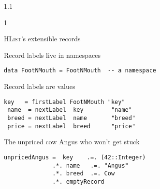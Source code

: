 \documentclass{slides}
\newenvironment{myslide}{\begin{slide}\color{Blue}\begin{boxedminipage}{1.1\hsize}\begin{boxedminipage}{1\hsize}\color{Black}
\vspace{-170\in}
}{%
\smallskip
\end{boxedminipage}
\end{boxedminipage}
\end{slide}}
\newenvironment{myslide}{\begin{slide}
}{%
\end{slide}}
\newenvironment{myslide}{\begin{slide}\color{White}\begin{boxedminipage}{1.1\hsize}\color{Black}
\vspace{-170\in}
}{%
\smallskip
\end{boxedminipage}
\end{slide}}
\newcommand{\header}[1]{{\large \color{Red} #1}}
\newcommand{\blau}[1]{{\vspace{-50\in}\normalsize \color{Blue} #1}}
\newcommand{\HList}{\textsc{HList}}
\begin{document}
\begin{myslide}

\header{\HList's extensible records}

\vspace{-77\in}

\blau{Record labels live in namespaces}

\smallskip

\begin{Verbatim}[fontfamily=courier,fontsize=\small,commandchars=\\\{\}]
 data FootNMouth = FootNMouth  -- a namespace
\end{Verbatim}

\vspace{-77\in}

\blau{Record labels are values}

\smallskip

\begin{Verbatim}[fontfamily=courier,fontsize=\small,commandchars=\\\{\}]
 key   = firstLabel FootNMouth "key"
 name  = nextLabel  key        "name"
 breed = nextLabel  name       "breed"
 price = nextLabel  breed      "price"  
\end{Verbatim}

\vspace{-77\in}

\blau{The unpriced cow Angus who won't get stuck}

\smallskip

\begin{Verbatim}[fontfamily=courier,fontsize=\small,commandchars=\\\{\}]
 unpricedAngus =  key    .=. (42::Integer)
              .*. name   .=. "Angus"
              .*. breed  .=. Cow
              .*. emptyRecord
\end{Verbatim}

\end{myslide}



\end{document}
